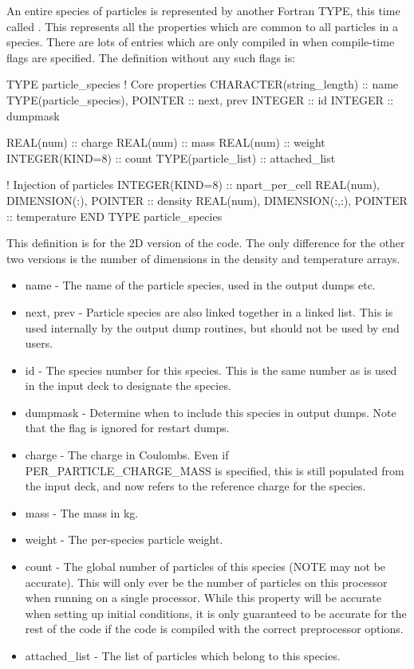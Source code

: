 An entire species of particles is represented by another Fortran TYPE, this
time called . This represents all the
properties which are common to all particles in a species. There are lots
of entries which are only compiled in when compile-time flags are specified.
The definition without any such flags is:
\begin{boxverbatim}
  TYPE particle_species
    ! Core properties
    CHARACTER(string_length) :: name
    TYPE(particle_species), POINTER :: next, prev
    INTEGER :: id
    INTEGER :: dumpmask

    REAL(num) :: charge
    REAL(num) :: mass
    REAL(num) :: weight
    INTEGER(KIND=8) :: count
    TYPE(particle_list) :: attached_list

    ! Injection of particles
    INTEGER(KIND=8) :: npart_per_cell
    REAL(num), DIMENSION(:), POINTER :: density
    REAL(num), DIMENSION(:,:), POINTER :: temperature
  END TYPE particle_species
\end{boxverbatim}

This definition is for the 2D version of the code. The only difference for
the other two versions is the number of dimensions in the density and
temperature arrays.

\begin{itemize}
\item name - The name of the particle species, used in the output dumps etc.
\item next, prev - Particle species are also linked together in a linked
  list. This is used internally by the output dump routines, but should not be
  used by end users.
\item id - The species number for this species. This is the same number as is
  used in the input deck to designate the species.
\item dumpmask - Determine when to include this species in output
  dumps. Note that the flag is ignored for restart dumps.
\item charge - The charge in Coulombs. Even if PER\_PARTICLE\_CHARGE\_MASS is
  specified, this is still populated from the input deck, and now refers to
  the reference charge for the species.
\item mass - The mass in kg.
\item weight - The per-species particle weight.
\item count - The global number of particles of this species (NOTE may not
  be accurate). This will only ever be the number of particles on this
  processor when running on a single processor. While this property will be
  accurate when setting up initial conditions, it is only guaranteed to be
  accurate for the rest of the code if the code is compiled with the correct
  preprocessor options.
\item attached\_list - The list of particles which belong to this species.
\end{itemize}

